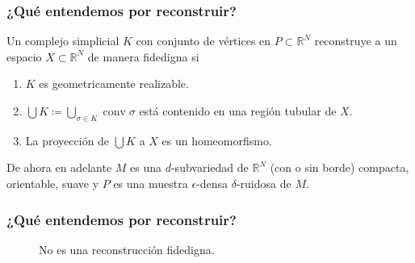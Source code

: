 \documentclass{beamer}
\newcommand{\R}{\mathbb{R}}
\DeclareMathOperator{\conv}{conv}
\begin{document}
\begin{frame}\frametitle{¿Qué entendemos por reconstruir?}
  \begin{Definicion}
    Un complejo simplicial \(K\) con conjunto de vértices en \(P\subset \R^N\)
    reconstruye a un espacio \(X\subset\R^N\) de manera fidedigna si 
    \begin{enumerate}
      \item \(K\) es geometricamente realizable.
      \item \(\bigcup K \coloneqq \bigcup_{\sigma \in K} \conv \sigma\) está contenido en
        una región tubular de \(X\).
      \item La proyección de \(\bigcup K\) a \(X\) es un homeomorfismo.
    \end{enumerate}
  \end{Definicion}
  \pause%
  De ahora en adelante \(M\) es una \(d\)-subvariedad de \(\R^N\) (con o sin borde) compacta, orientable, 
  suave y \(P\) es una muestra \(\epsilon\)-densa
  \(\delta\)-ruidosa de \(M\).
\end{frame}

\begin{frame}\frametitle{¿Qué entendemos por reconstruir?}
  \begin{figure}[H]
    \centering{}
    \caption{No es una reconstrucción fidedigna.}
  \end{figure}
\end{frame}
\end{document}
